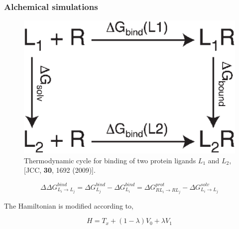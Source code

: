 \documentclass{beamer}
\begin{document}
\begin{frame}
\frametitle{Alchemical simulations}


\begin{figure}
\includegraphics[scale=0.08]{alchemical.eps}
\caption{{\scriptsize  Thermodynamic cycle for binding of two protein ligands $L_1$ and $L_2$,
[JCC, {\bf 30}, 1692 (2009)]. }}
\end{figure}

\begin{equation}                                                                                                                                            
\label{Eq:ipspot}          
\Delta \Delta G_{L_i \rightarrow L_j}^{bind}=  \Delta G_{L_j}^{bind}-\Delta G_{L_i}^{bind}
= \Delta G_{RL_i \rightarrow RL_j}^{prot}- \Delta G_{L_i \rightarrow L_j}^{solv}
\end{equation}

The Hamiltonian is modified according to,

\begin{equation}                                                                                                                                            
	H=T_x + (1-\lambda)V_0 + \lambda V_1
\end{equation}



\end{frame}
\end{document}
